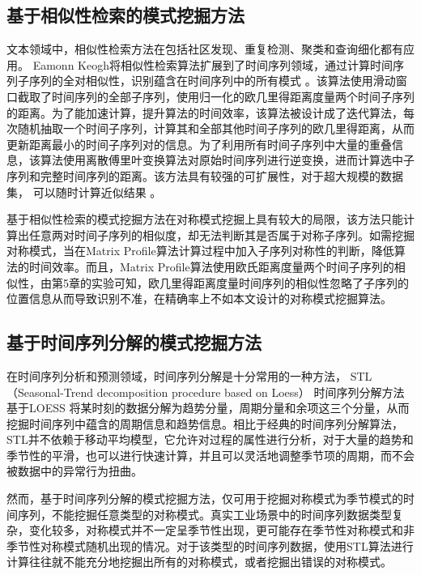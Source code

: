 \subsection{基于相似性检索的模式挖掘方法}
文本领域中，相似性检索方法在包括社区发现、重复检测、聚类和查询细化都有应用\cite{DBLP:conf/www/BayardoMS07}。
Eamonn Keogh将相似性检索算法扩展到了时间序列领域，通过计算时间序列子序列的全对相似性，识别蕴含在时间序列中的所有模式
\cite{DBLP:conf/kdd/RakthanmanonCMBWZZK12}。该算法使用滑动窗口截取了时间序列的全部子序列，使用归一化的欧几里得距离度量两个时间子序列的距离。为了能加速计算，提升算法的时间效率，该算法被设计成了迭代算法，每次随机抽取一个时间子序列，计算其和全部其他时间子序列的欧几里得距离，从而更新距离最小的时间子序列对的信息。为了利用所有时间子序列中大量的重叠信息，该算法使用离散傅里叶变换算法对原始时间序列进行逆变换，进而计算选中子序列和完整时间序列的距离。该方法具有较强的可扩展性，对于超大规模的数据集，
可以随时计算近似结果
\cite{DBLP:conf/icdm/ZhuZSYFMBK16}。

基于相似性检索的模式挖掘方法在对称模式挖掘上具有较大的局限，该方法只能计算出任意两对时间子序列的相似度，却无法判断其是否属于对称子序列。如需挖掘对称模式，当在Matrix Profile算法计算过程中加入子序列对称性的判断，降低算法的时间效率。而且，Matrix Profile算法使用欧氏距离度量两个时间子序列的相似性，由第5章的实验可知，欧几里得距离度量时间序列的相似性忽略了子序列的位置信息从而导致识别不准，在精确率上不如本文设计的对称模式挖掘算法。

\subsection{基于时间序列分解的模式挖掘方法}
在时间序列分析和预测领域，时间序列分解是十分常用的一种方法，
STL（Seasonal-Trend decomposition procedure based on Loess）\cite{DBLP:conf/www/BayardoMS07}
时间序列分解方法基于LOESS\cite{DBLP:books/lib/HastieTF09}
将某时刻的数据分解为趋势分量，周期分量和余项这三个分量，从而挖掘时间序列中蕴含的周期信息和趋势信息。相比于经典的时间序列分解算法，STL并不依赖于移动平均模型，它允许对过程的属性进行分析，对于大量的趋势和季节性的平滑，也可以进行快速计算，并且可以灵活地调整季节项的周期，而不会被数据中的异常行为扭曲。

然而，基于时间序列分解的模式挖掘方法，仅可用于挖掘对称模式为季节模式的时间序列，不能挖掘任意类型的对称模式。真实工业场景中的时间序列数据类型复杂，变化较多，对称模式并不一定呈季节性出现，更可能存在季节性对称模式和非季节性对称模式随机出现的情况。对于该类型的时间序列数据，使用STL算法进行计算往往就不能充分地挖掘出所有的对称模式，或者挖掘出错误的对称模式。

